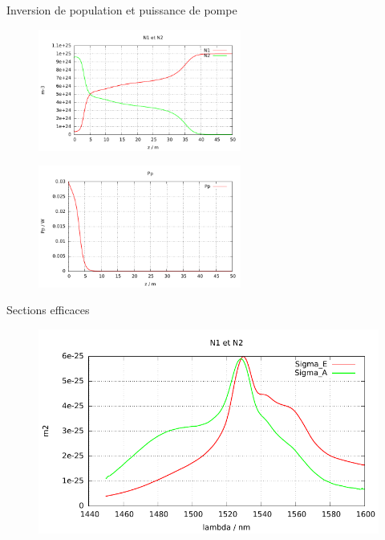 \documentclass{beamer}
\begin{document}
\begin{frame}{Inversion de population et puissance de pompe}
\vspace{-1cm}
\begin{figure}
    \centering
    \includegraphics[width=\textwidth,height=4cm]{N.pdf}
\end{figure}
\vspace{-1cm}
\begin{figure}
    \centering
    \includegraphics[width=\textwidth,height=4cm]{Pp.pdf}
\end{figure}

\end{frame}

\begin{frame}{Sections efficaces}

\begin{figure}
    \centering
    \includegraphics[width=\textwidth]{sigma.pdf}
\end{figure}

\end{frame}
\end{document}

